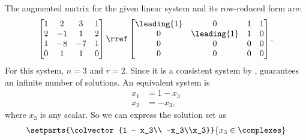 The augmented matrix for the given linear system and its row-reduced form are:
\begin{align*}
\begin{bmatrix}
1 & 2 & 3 & 1\\
2 & -1 & 1 & 2\\
1 & -8 & -7 & 1\\
0 & 1 & 1 & 0
\end{bmatrix}
\rref
\begin{bmatrix}
\leading{1} & 0 & 1 & 1\\
0 & \leading{1} & 1 & 0\\
0 & 0 & 0 & 0\\
0 & 0 & 0 & 0
\end{bmatrix}.
\end{align*}
For this system, $n = 3$ and $r = 2$.  
Since it is a consistent system by ,   guarantees an infinite number of solutions.  An equivalent system is
\begin{align*}
x_1 &= 1 - x_3\\
x_2 &= -x_3,
\end{align*}
where $x_3$ is any scalar.  So we can express the solution set as
%
\begin{align*}
\setparts{\colvector{1 - x_3\\ -x_3\\x_3}}{x_3\in\complexes}
\end{align*}
%
